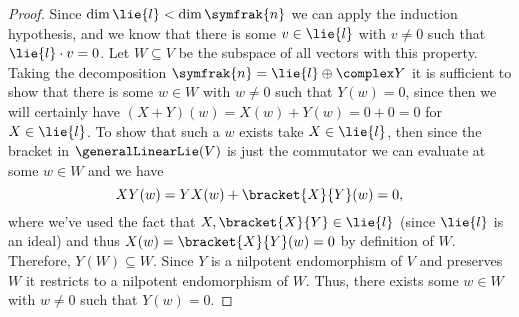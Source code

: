 \documentclass[fleqn]{NotesClass}
\newcommand{\nilpotentLie}{\symfrak{n}}
\begin{document}
\begin{thm}{}{}
\begin{proof}
            Since \(\dim \lie{l} < \dim \nilpotentLie\) we can apply the induction hypothesis, and we know that there is some \(v \in \lie{l}\) with \(v \ne 0\) such that \(\lie{l} \cdot v = 0\).
            Let \(W \subseteq V\) be the subspace of all vectors with this property.
            Taking the decomposition \(\nilpotentLie = \lie{l} \oplus \complex Y\) it is sufficient to show that there is some \(w \in W\) with \(w \ne 0\) such that \(Y(w) = 0\), since then we will certainly have \((X + Y)(w) = X(w) + Y(w) = 0 + 0 = 0\) for \(X \in \lie{l}\).
            To show that such a \(w\) exists take \(X \in \lie{l}\), then since the bracket in \(\generalLinearLie(V)\) is just the commutator we can evaluate at some \(w \in W\) and we have
            \begin{equation}
                XY(w) = YX(w) + \bracket{X}{Y}(w) = 0,
            \end{equation}
            where we've used the fact that \(X, \bracket{X}{Y} \in \lie{l}\) (since \(\lie{l}\) is an ideal) and thus \(X(w) = \bracket{X}{Y}(w) = 0\) by definition of \(W\).
            Therefore, \(Y(W) \subseteq W\).
            Since \(Y\) is a nilpotent endomorphism of \(V\) and preserves \(W\) it restricts to a nilpotent endomorphism of \(W\).
            Thus, there exists some \(w \in W\) with \(w \ne 0\) such that \(Y(w) = 0\).
        \end{proof}
    \end{thm}
    
	
%	
	
\end{document}
